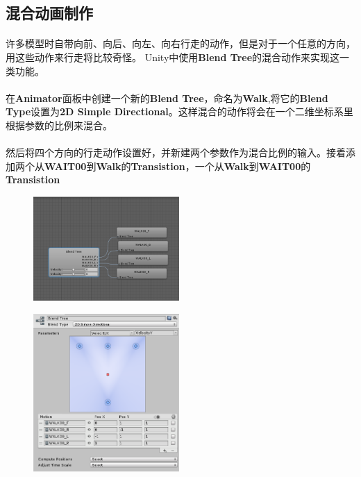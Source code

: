 \documentclass{article}
\begin{document}
\subsection{混合动画制作}
\paragraph{}
许多模型时自带向前、向后、向左、向右行走的动作，但是对于一个任意的方向，用这些动作来行走将比较奇怪。
Unity中使用\textbf{Blend Tree}的混合动作来实现这一类功能。
\paragraph{}
在\textbf{Animator}面板中创建一个新的\textbf{Blend Tree}，命名为\textbf{Walk},将它的\textbf{Blend Type}设置为\textbf{2D Simple Directional}。这样混合的动作将会在一个二维坐标系里根据参数的比例来混合。
\paragraph{}
然后将四个方向的行走动作设置好，并新建两个参数作为混合比例的输入。接着添加两个从\textbf{WAIT00}到\textbf{Walk}的\textbf{Transistion}，一个从\textbf{Walk}到\textbf{WAIT00}的\textbf{Transistion}
\begin{figure}[H]
\begin{minipage}{0.5\linewidth}
  \includegraphics[width=15em]{blend_tree1.png}\\
  \caption{}\label{2-3}
\end{minipage}
\begin{minipage}{0.5\linewidth}
  \includegraphics[width=15em]{blend_tree2.png}\\
  \caption{}\label{2-4}
\end{minipage}
\end{figure}
\end{document}
